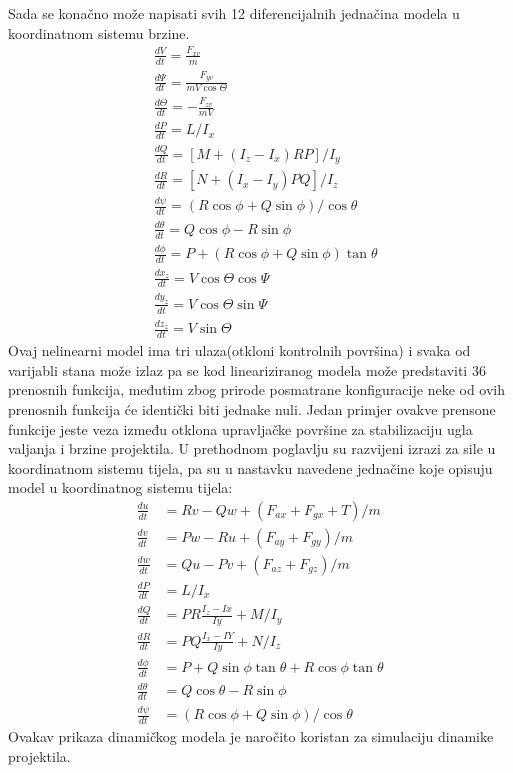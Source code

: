 Sada se konačno može napisati svih 12 diferencijalnih jednačina modela u koordinatnom sistemu brzine.
\begin{align}
    &\frac{dV}{dt} = \frac{F_{xv}}{m}\\
    &\frac{d\Psi}{dt} = \frac{F_{yv}}{mV\cos\Theta}\\
    &\frac{d\Theta}{dt} = -\frac{F_{zv}}{mV}\\
    &\frac{dP}{dt}=L/I_x\\
    &\frac{dQ}{dt}=[M+(I_z-I_x)RP]/I_y\\
    &\frac{dR}{dt}=[N+(I_x-I_y)PQ]/I_z\\
    &\frac{d\psi}{dt}=(R\cos\phi+Q\sin\phi)/\cos\theta\\
    &\frac{d\theta}{dt}=Q\cos\phi-R\sin\phi\\
    &\frac{d\phi}{dt}=P+(R\cos\phi+Q\sin\phi)\tan\theta\\
    &\frac{dx_z}{dt}=V\cos\Theta\cos\Psi\\
    &\frac{dy_z}{dt}=V\cos\Theta\sin\Psi\\
    &\frac{dz_z}{dt}=V\sin\Theta
\end{align}
Ovaj nelinearni model ima tri ulaza(otkloni kontrolnih površina) i svaka od varijabli stana može izlaz pa se kod lineariziranog 
modela može predstaviti 36 prenosnih funkcija, međutim zbog prirode posmatrane konfiguracije 
neke od ovih prenosnih funkcija će identički biti jednake nuli. Jedan primjer ovakve prensone funkcije 
jeste veza između otklona upravljačke površine za stabilizaciju ugla valjanja i brzine projektila. 
U prethodnom poglavlju su razvijeni izrazi za sile u koordinatnom sistemu tijela, pa su u nastavku navedene 
jednačine koje opisuju model u koordinatnog sistemu tijela:
\begin{align}
    \label{eq:prva} \frac{du}{dt} &=Rv - Qw + (F_{ax} + F_{gx} + T)/m\\
    \frac{dv}{dt} &=Pw - Ru + (F_{ay}+F_{gy})/m\\
    \frac{dw}{dt} &=Qu - Pv +(F_{az}+F_{gz})/m\\
    \frac{dP}{dt} &=L/I_x\\
    \frac{dQ}{dt} &= PR\frac{I_z-Ix}{Iy} + M/I_y\\
    \frac{dR}{dt} &= PQ\frac{I_x-IY}{Iy} + N/I_z\\
    \frac{d\phi}{dt} &=P + Q\sin\phi\tan\theta + R\cos\phi\tan\theta\\
    \frac{d\theta}{dt} &=Q\cos\theta - R\sin\phi\\
    \label{eq:zadnja} \frac{d\psi}{dt}&=(R\cos\phi+Q\sin\phi)/\cos\theta
\end{align}
Ovakav prikaza dinamičkog modela je naročito koristan za simulaciju dinamike projektila. 
